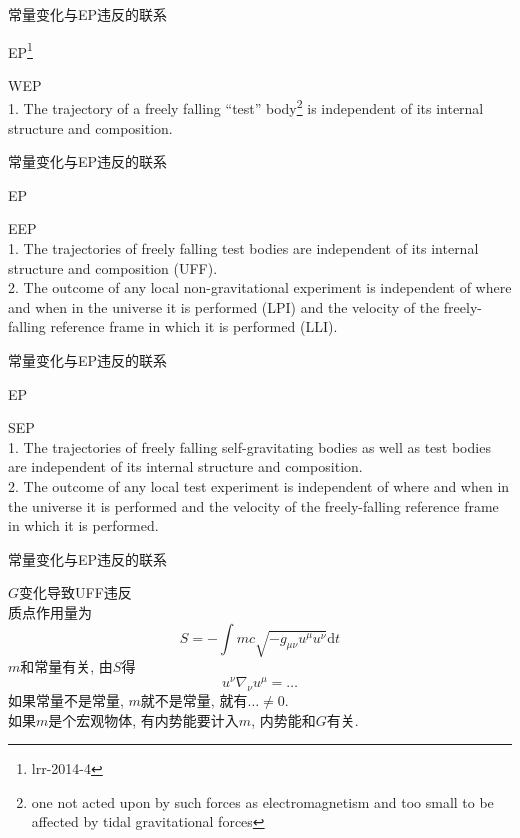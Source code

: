 \documentclass{ctexbeamer}
\title{}
\author{}
\date{}
\def\d{\mathrm{d}}
\begin{document}
\begin{frame}
    常量变化与EP违反的联系

    EP\footnote{lrr-2014-4}

    WEP\\
    1. The trajectory of a freely
    falling ``test'' body\footnote{one not acted upon by such forces as electromagnetism and too small to be
    affected by tidal gravitational forces} is independent of its internal structure and composition.
\end{frame}
\begin{frame}
    常量变化与EP违反的联系

    EP

    EEP\\
    1. The trajectories of freely
    falling test bodies are independent of its internal structure and composition (UFF).\\
    2. The outcome of any local non-gravitational experiment is independent of  where and when in
    the universe it is performed (LPI) and the velocity of the
    freely-falling reference frame in which it is performed (LLI).
\end{frame}
\begin{frame}
    常量变化与EP违反的联系

    EP

    SEP\\
    1. The trajectories of freely
    falling self-gravitating bodies as well as test bodies are independent of its internal structure and composition.\\
    2. The outcome of any local test experiment is independent of  where and when in
    the universe it is performed and the velocity of the
    freely-falling reference frame in which it is performed.
\end{frame}
\begin{frame}
    常量变化与EP违反的联系

    $G$变化导致UFF违反\\
    质点作用量为
    \begin{equation*}
        S=-\int mc\sqrt{-g_{\mu\nu}u^{\mu}u^{\nu}}\d t
    \end{equation*}
    $m$和常量有关, 由$S$得
    \begin{equation*}
        u^\nu\nabla_\nu u^\mu=\dots
    \end{equation*}
    如果常量不是常量, $m$就不是常量, 就有$\dots\ne 0$.\\
    如果$m$是个宏观物体, 有内势能要计入$m$, 内势能和$G$有关.
\end{frame}
\end{document}
